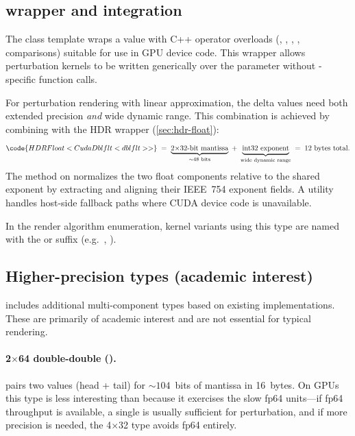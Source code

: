 \subsection{ wrapper and  integration}
\label{subsec:ep-cudadblflt}

The  class template wraps a  value with
C++ operator overloads (\code{+}, \code{-}, \code{*}, \code{/}, comparisons)
suitable for use in GPU device code.  This wrapper allows perturbation kernels to be
written generically over the  parameter without
-specific function calls.

For perturbation rendering with linear approximation, the delta values need
both extended precision \emph{and} wide dynamic range.  This combination is achieved by
combining  with the HDR wrapper
(\cref{sec:hdr-float}):
\begingroup\footnotesize
\[
  \code{HDRFloat<CudaDblflt<dblflt>>} \;=\;
    \underbrace{\text{2$\times$32-bit mantissa}}_{\sim\text{48~bits}}
    \;+\;
    \underbrace{\text{int32 exponent}}_{\text{wide dynamic range}}
    \;=\; \text{12~bytes total.}
\]
\endgroup
The  method on  normalizes the two float
components relative to the shared exponent by extracting and aligning their
IEEE~754 exponent fields.  A  utility handles
host-side fallback paths where CUDA device code is unavailable.

In the render algorithm enumeration, kernel variants using this type are named
with the  or  suffix (e.g.\
, ).

\subsection{Higher-precision types (academic interest)}
\label{subsec:ep-higher-prec}

\FractalShark{} includes additional multi-component types based on existing
implementations.  These are primarily of academic interest and are not
essential for typical rendering.

\paragraph{2\texorpdfstring{$\times$}{x}64 double-double ().}
\code{MattDbldbl} pairs two \code{double} values (head + tail) for
${\sim}104$~bits of mantissa in 16~bytes.  On GPUs this type is less interesting
than \code{dblflt} because it exercises the slow fp64 units---if fp64
throughput is available, a single \code{double} is usually sufficient for
perturbation, and if more precision is needed, the 4$\times$32 type avoids
fp64 entirely.

